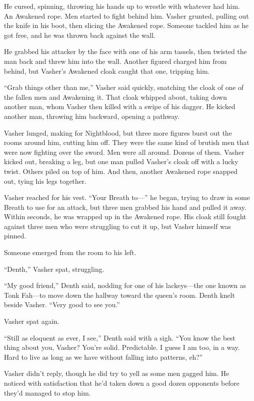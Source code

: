 He cursed, spinning, throwing his hands up to wrestle with whatever had him. An Awakened rope. Men started to fight behind him. Vasher grunted, pulling out the knife in his boot, then slicing the Awakened rope. Someone tackled him as he got free, and he was thrown back against the wall.

He grabbed his attacker by the face with one of his arm tassels, then twisted the man back and threw him into the wall. Another figured charged him from behind, but Vasher’s Awakened cloak caught that one, tripping him.

“Grab things other than me,” Vasher said quickly, snatching the cloak of one of the fallen men and Awakening it. That cloak whipped about, taking down another man, whom Vasher then killed with a swipe of his dagger. He kicked another man, throwing him backward, opening a pathway.

Vasher lunged, making for Nightblood, but three more figures burst out the rooms around him, cutting him off. They were the same kind of brutish men that were now fighting over the sword. Men were all around. Dozens of them. Vasher kicked out, breaking a leg, but one man pulled Vasher’s cloak off with a lucky twist. Others piled on top of him. And then, another Awakened rope snapped out, tying his legs together.

Vasher reached for his vest. “Your Breath to—” he began, trying to draw in some Breath to use for an attack, but three men grabbed his hand and pulled it away. Within seconds, he was wrapped up in the Awakened rope. His cloak still fought against three men who were struggling to cut it up, but Vasher himself was pinned.

Someone emerged from the room to his left.

“Denth,” Vasher spat, struggling.

“My good friend,” Denth said, nodding for one of his lackeys—the one known as Tonk Fah—to move down the hallway toward the queen’s room. Denth knelt beside Vasher. “Very good to see you.”

Vasher spat again.

“Still as eloquent as ever, I see,” Denth said with a sigh. “You know the best thing about you, Vasher? You’re solid. Predictable. I guess I am too, in a way. Hard to live as long as we have without falling into patterns, eh?”

Vasher didn’t reply, though he did try to yell as some men gagged him. He noticed with satisfaction that he’d taken down a good dozen opponents before they’d managed to stop him.

